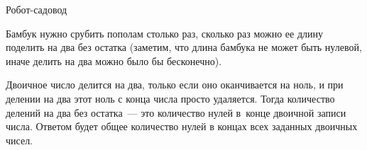 \begin{tutorial}{Робот-садовод\label{robotgardenertutorial}}

  Бамбук нужно срубить пополам столько раз, сколько раз можно ее длину поделить на два без остатка (заметим, что длина бамбука не может быть нулевой, иначе делить на два можно было бы бесконечно). 

Двоичное число делится на два, только если оно оканчивается на ноль, и при делении на два этот ноль с конца числа просто удаляется. Тогда количество делений на два без остатка~--- это количество нулей в~конце двоичной записи числа. Ответом будет общее количество нулей в концах всех заданных двоичных чисел.

\end{tutorial}
